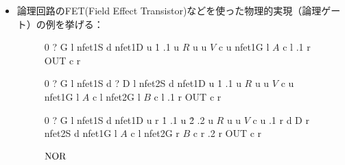 \begin{itemize}
\item
論理回路のFET(Field Effect Transistor)などを使った物理的実現（論理ゲート）の例を挙げる：
\begin{figure}[htb]
   \centering
   \begin{minipage}{0.3\columnwidth}
      \centering
      \begin{circuit}0
          {?} G l %
         \frompin nfet1S
          d
         \frompin nfet1D
          u
         \.1
         \frompin .1
          u
         \nl{} {$R$} u
          u
         \cc{}  {$V$} c u
         \frompin nfet1G
          l
         \cc{}  {$A$} c l
         \frompin .1 
          r
         \cc{}  {OUT} c r
      \end{circuit}
      \caption{$\noT$}\label{NOT}
   \end{minipage} 
   \begin{minipage}{0.3\columnwidth}
         \centering
         \begin{circuit}0 
             {?} G l
            \frompin nfet1S
             d
             {?} D l
            \frompin nfet2S
             d
            \frompin nfet1D
             u
            \.1
            \frompin .1
             u
            \nl{} {$R$} u
             u
            \cc{}  {$V$} c u
            \frompin nfet1G
             l
            \cc{}  {$A$} c l
            \frompin nfet2G
             l
            \cc{}  {$B$} c l
            \frompin .1
             r
            \cc{}  {OUT } c r
         \end{circuit}
      \caption{$\nand$}
   \end{minipage} 
   \begin{minipage}{0.3\columnwidth}
      \begin{circuit}0
          {?} G l %
         \frompin nfet1S
          d
         \frompin nfet1D
          u
          r
         \.1
         \frompin .1
          u
         \.2
         \frompin .2
          u
         \nl{} {$R$} u
          u
         \cc{}  {$V$} c u
         \frompin .1
          r
          d
          {} D r
         \frompin nfet2S 
          d
         \frompin nfet1G
          l
         \cc{}  {$A$} c l
         \frompin nfet2G
          r
         \cc{}  {$B$} c r
         \frompin .2 
          r
         \cc{}  {OUT} c r
      \end{circuit}
      \caption{$\operatorname{NOR}$}
   \end{minipage} 
\end{figure}


\end{itemize}
